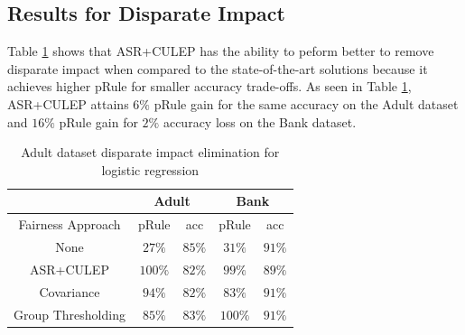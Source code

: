 \documentclass[runningheads]{llncs}
\begin{document}
\subsection{Results for Disparate Impact}
Table \ref{tab:dispimpact} shows that ASR+CULEP has the ability to peform better to remove disparate impact when compared to the state-of-the-art solutions because it achieves higher pRule for smaller accuracy trade-offs. As seen in Table \ref{tab:dispimpact}, ASR+CULEP attains $6\%$ pRule gain for the same accuracy on the Adult dataset and $16\%$ pRule gain for $2\%$ accuracy loss on the Bank dataset.
\begin{table}[!htbp]
      \centering
\begin{tabular}{|c|c|c|c|c|}
\hline
{} & \multicolumn{2}{c|}{Adult} & \multicolumn{2}{c|}{Bank} \vline \\
\hline
Fairness Approach & pRule & acc & pRule & acc\\
\hline
None & $27\%$ & $85\%$  & $31\%$  & $91\%$  \\
\hline
ASR+CULEP & $100\%$ & $82\%$  & $99\%$  & $89\%$  \\
\hline
Covariance & $94\%$ & $82\%$  & $83\%$  & $91\%$  \\
\hline
Group Thresholding & $85\%$ & $83\%$  & $100\%$  & $91\%$ \\
\hline 
\end{tabular}
\\
\caption{Adult dataset disparate impact elimination for logistic regression}
\label{tab:dispimpact}
\end{table}
\end{document}
